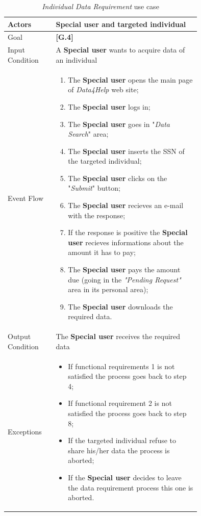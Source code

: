 \begin{center}
\begin{table}[H]
\begin{tabular}{ | l | p{0.75\linewidth} | }
  \hline
    Actors & \textbf{Special user} and targeted individual \\ \hline
    Goal & \textbf{[G.4]} \\ \hline
    Input Condition & A \textbf{Special user} wants to acquire data of an individual \\ \hline
    Event Flow & \begin{minipage}[t]{0.7\textwidth}
      \begin{enumerate}
        \item The \textbf{Special user} opens the main page of \textit{Data4Help} web site;
        \item The \textbf{Special user} logs in;
        \item The \textbf{Special user} goes in "\textit{Data Search}" area;
        \item The \textbf{Special user} inserts the SSN of the targeted individual;
        \item The \textbf{Special user} clicks on the "\textit{Submit}" button;
        \item The \textbf{Special user} recieves an e-mail with the response;
        \item If the response is positive the \textbf{Special user} recieves informations about the amount it has to pay;
        \item The \textbf{Special user} pays the amount due (going in the \textit{"Pending Request"} area in its personal area);
        \item The \textbf{Special user} downloads the required data.
      \end{enumerate}
    \smallskip
  \end{minipage} \\ \hline
  Output Condition & The \textbf{Special user} receives the required data \\ \hline
  Exceptions & \begin{minipage}[t]{0.7\textwidth}
    \begin{itemize}
      \smallskip
      \item If functional requirements 1 is not satisfied the process goes back to step 4;
      \item If functional requirement 2 is not satisfied the process goes back to step 8;
      \item If the targeted individual refuse to share his/her data the process is aborted;
      \item If the \textbf{Special user} decides to leave the data requirement process this one is aborted.
    \end{itemize}
    \smallskip
  \end{minipage}  \\ \hline
\end{tabular}
\caption{\textit{Individual Data Requirement} use case}
\label{table:individualDataRequirement}
\end{table}
\end{center}

